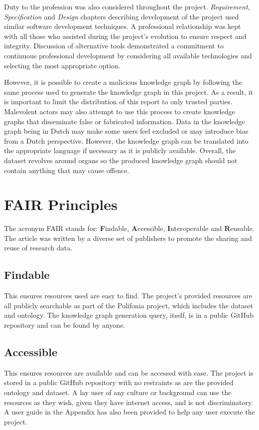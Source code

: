 Duty to the profession was also considered throughout the project. \textit{Requirement}, \textit{Specification} and \textit{Design} chapters describing development of the project used similar software development techniques. A professional relationship was kept with all those who assisted during the project's evolution to ensure respect and integrity. Discussion of alternative tools demonstrated a commitment to continuous professional development by considering all available technologies and selecting the most appropriate option.

However, it is possible to create a malicious knowledge graph by following the same process used to generate the knowledge graph in this project. As a result, it is important to limit the distribution of this report to only trusted parties. Malevolent actors may also attempt to use this process to create knowledge graphs that disseminate false or fabricated information. Data in the knowledge graph being in Dutch may make some users feel excluded or may introduce bias from a Dutch perspective. However, the knowledge graph can be translated into the appropriate language if necessary as it is publicly available. Overall, the dataset revolves around organs so the produced knowledge graph should not contain anything that may cause offence.

\section{FAIR Principles}
\hspace{0.5cm} The acronym FAIR stands for: \textbf{F}indable, \textbf{A}ccessible, \textbf{I}nteroperable and \textbf{R}eusable. The article \cite{fairprinciples} was written by a diverse set of publishers to promote the sharing and reuse of research data. 

\subsection{Findable}
\hspace{0.5cm} This ensures resources used are easy to find. The project's provided resources are all publicly searchable as part of the Polifonia project, which includes the dataset and ontology. The knowledge graph generation query, itself, is in a public GitHub repository and can be found by anyone. 

\subsection{Accessible}
\hspace{0.5cm} This ensures resources are available and can be accessed with ease. The project is stored in a public GitHub repository with no restraints as are the provided ontology and dataset. A lay user of any culture or background can use the resources as they wish, given they have internet access, and is not discriminatory. A user guide in the Appendix has also been provided to help any user execute the project. 

